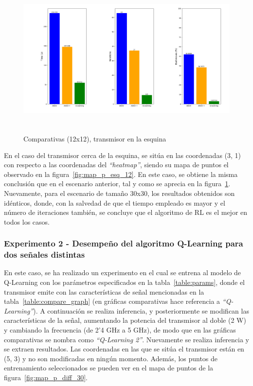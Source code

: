 \begin{figure} [tp]
    \begin{center}
    \includegraphics[height=8cm]{imagenes/cap4/20_comp_esq_12.png}
    \end{center}
    \caption[Comparativas (12x12), transmisor en la esquina]{Comparativas (12x12), transmisor en la esquina}
    \label{fig:comp_esq_12}
\end{figure}

En el caso del transmisor cerca de la esquina, se sitúa en las coordenadas (3, 1) con respecto a las coordenadas del \emph{``heatmap''}, siendo su mapa de puntos el observado en la figura~\ref{fig:map_p_esq_12}. En este caso, se obtiene la misma conclusión que en el escenario anterior, tal y como se aprecia en la figura~\ref{fig:comp_esq_12}. Nuevamente, para el escenario de tamaño 30x30, los resultados obtenidos son idénticos, donde, con la salvedad de que el tiempo empleado es mayor y el número de iteraciones también, se concluye que el algoritmo de \ac{RL} es el mejor en todos los casos.\\

\subsubsection{Experimento 2 - Desempeño del algoritmo Q-Learning para dos señales distintas}
\label{subsubsec:experimentos_1}

En este caso, se ha realizado un experimento en el cual se entrena al modelo de Q-Learning con los parámetros especificados en la tabla~\ref{table:params}, donde el transmisor emite con las características de señal mencionadas en la tabla~\ref{table:compare_graph} (en gráficas comparativas hace referencia a \emph{``Q-Learning''}). A continuación se realiza inferencia, y posteriormente se modifican las características de la señal, aumentando la potencia del transmisor al doble (2 W) y cambiando la frecuencia (de 2'4 GHz a 5 GHz), de modo que en las gráficas comparativas se nombra como \emph{``Q-Learning 2''}. Nuevamente se realiza inferencia y se extraen resultados. Las coordenadas en las que se sitúa el transmisor están en (5, 3) y no son modificadas en ningún momento. Además, los puntos de entrenamiento seleccionados se pueden ver en el mapa de puntos de la figura~\ref{fig:map_p_diff_30}.\\

